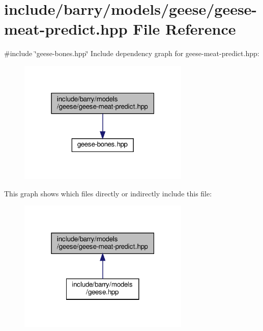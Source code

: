 \hypertarget{geese-meat-predict_8hpp}{}\section{include/barry/models/geese/geese-\/meat-\/predict.hpp File Reference}
\label{geese-meat-predict_8hpp}
{\ttfamily \#include \char`\"{}geese-\/bones.\+hpp\char`\"{}}\newline
Include dependency graph for geese-\/meat-\/predict.hpp\+:\nopagebreak
\begin{figure}[H]
\begin{center}
\leavevmode
\includegraphics[width=231pt]{geese-meat-predict_8hpp__incl}
\end{center}
\end{figure}
This graph shows which files directly or indirectly include this file\+:\nopagebreak
\begin{figure}[H]
\begin{center}
\leavevmode
\includegraphics[width=231pt]{geese-meat-predict_8hpp__dep__incl}
\end{center}
\end{figure}
